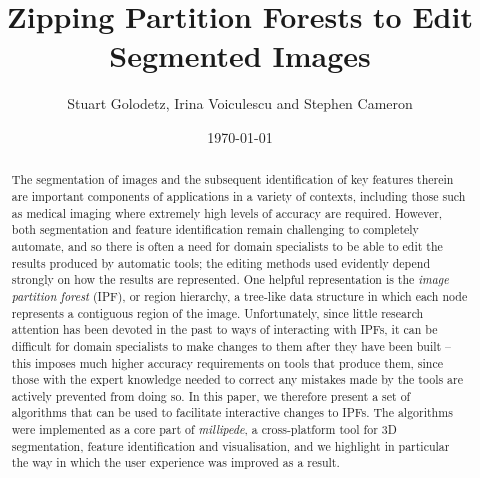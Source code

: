 \documentclass[10pt,twocolumn,twoside]{IEEEtran}
\begin{document}
\title{Zipping Partition Forests to Edit Segmented Images}
\author{Stuart Golodetz, Irina Voiculescu and Stephen Cameron}
\date{\today}
\maketitle

\begin{abstract}

\noindent The segmentation of images and the subsequent identification of key features therein are important components of applications in a variety of contexts, including those such as medical imaging where extremely high levels of accuracy are required. However, both segmentation and feature identification remain challenging to completely automate, and so there is often a need for domain specialists to be able to edit the results produced by automatic tools; the editing methods used evidently depend strongly on how the results are represented. One helpful representation is the \emph{image partition forest} (IPF), or region hierarchy, a tree-like data structure in which each node represents a contiguous region of the image. Unfortunately, since little research attention has been devoted in the past to ways of interacting with IPFs, it can be difficult for domain specialists to make changes to them after they have been built -- this imposes much higher accuracy requirements on tools that produce them, since those with the expert knowledge needed to correct any mistakes made by the tools are actively prevented from doing so. In this paper, we therefore present a set of algorithms that can be used to facilitate interactive changes to IPFs. The algorithms were implemented as a core part of \emph{millipede}, a cross-platform tool for 3D segmentation, feature identification and visualisation, and we highlight in particular the way in which the user experience was improved as a result.
\end{abstract}
\end{document}
